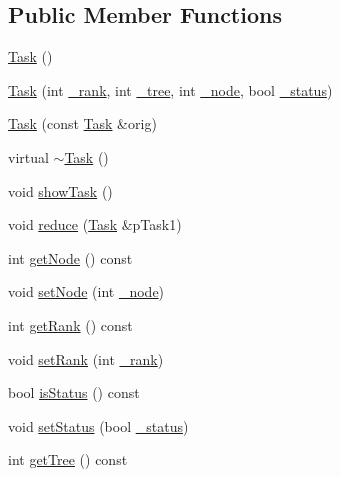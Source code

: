 \subsection*{Public Member Functions}
\begin{DoxyCompactItemize}
\item 
\hyperlink{classrdf_1_1Task_a8457894b8d8fa131f71a7d517ba7bf74}{Task} ()
\item 
\hyperlink{classrdf_1_1Task_ae22d87a6bbaa872fb9a2d7b635e23017}{Task} (int \hyperlink{classrdf_1_1Task_a66806490016907e1acd9ad771811e4d5}{\+\_\+rank}, int \hyperlink{classrdf_1_1Task_a3986abc1d8a8c79bde8d7525c6faa0bd}{\+\_\+tree}, int \hyperlink{classrdf_1_1Task_ab505294f64848a3ee104c9efa45528b5}{\+\_\+node}, bool \hyperlink{classrdf_1_1Task_a43face20dfc0d868ef400070d0fd43bb}{\+\_\+status})
\item 
\hyperlink{classrdf_1_1Task_a1858fac2f9519af47ac11fcb742d4866}{Task} (const \hyperlink{classrdf_1_1Task}{Task} \&orig)
\item 
virtual \hyperlink{classrdf_1_1Task_aad3f295247fa60106899c5ee5b9eae8a}{$\sim$\+Task} ()
\item 
void \hyperlink{classrdf_1_1Task_aed5f96455f9684078a5fa8fce849d197}{show\+Task} ()
\item 
void \hyperlink{classrdf_1_1Task_aee187dbed7bb9b900114920162f9866b}{reduce} (\hyperlink{classrdf_1_1Task}{Task} \&p\+Task1)
\item 
int \hyperlink{classrdf_1_1Task_abed5b1d313483299a04f0ccb63901c54}{get\+Node} () const 
\item 
void \hyperlink{classrdf_1_1Task_aa7667e08b39f5b6cae63aa0abeb4c412}{set\+Node} (int \hyperlink{classrdf_1_1Task_ab505294f64848a3ee104c9efa45528b5}{\+\_\+node})
\item 
int \hyperlink{classrdf_1_1Task_ab1bcd01480e2c381541b6346f15cf4b7}{get\+Rank} () const 
\item 
void \hyperlink{classrdf_1_1Task_aa55d27b31ed812e31e21fa5676208f1b}{set\+Rank} (int \hyperlink{classrdf_1_1Task_a66806490016907e1acd9ad771811e4d5}{\+\_\+rank})
\item 
bool \hyperlink{classrdf_1_1Task_a2d78d32594b0c8f76a599cc3883211c7}{is\+Status} () const 
\item 
void \hyperlink{classrdf_1_1Task_af030aac32a3943f2cd0fb22c8e964071}{set\+Status} (bool \hyperlink{classrdf_1_1Task_a43face20dfc0d868ef400070d0fd43bb}{\+\_\+status})
\item 
int \hyperlink{classrdf_1_1Task_a942297717d39a25db9ed8636ef72dca1}{get\+Tree} () const 
\item 

\end{DoxyCompactItemize}
